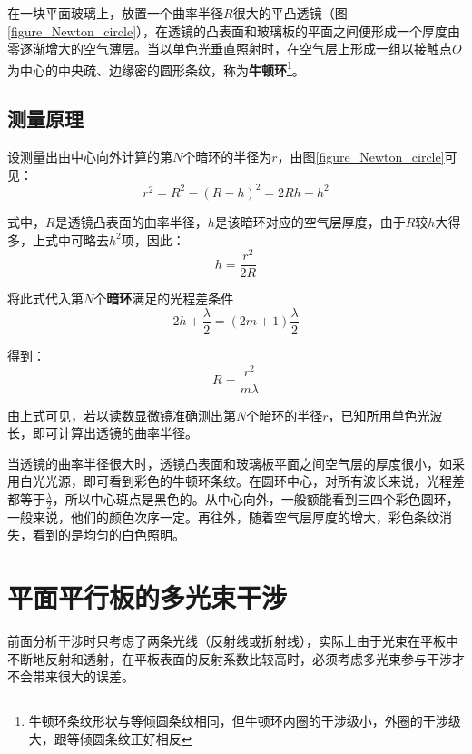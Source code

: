 \documentclass[UTF8]{ctexart}
\begin{document}
	在一块平面玻璃上，放置一个曲率半径$ R $很大的平凸透镜（图\ref{figure_Newton_circle}），在透镜的凸表面和玻璃板的平面之间便形成一个厚度由零逐渐增大的空气薄层。当以单色光垂直照射时，在空气层上形成一组以接触点$ O $为中心的中央疏、边缘密的圆形条纹，称为\textbf{牛顿环}\footnote{牛顿环条纹形状与等倾圆条纹相同，但牛顿环内圈的干涉级小，外圈的干涉级大，跟等倾圆条纹正好相反}。
	
	\subsection{测量原理}
	设测量出由中心向外计算的第$ N $个暗环的半径为$ r $，由图\ref{figure_Newton_circle}可见：
	\begin{equation}
		r^{2}=R^{2}-(R-h)^{2}=2 R h-h^{2}
	\end{equation}
	
\noindent 式中，$ R $是透镜凸表面的曲率半径，$ h $是该暗环对应的空气层厚度，由于$ R $较$ h $大得多，上式中可略去$ h^{2} $项，因此：
\begin{equation}
	h=\frac{r^{2}}{2 R}
\end{equation}

\noindent 将此式代入第$ N $个\textbf{暗环}满足的光程差条件
\begin{equation}
	2 h+\frac{\lambda}{2}=(2 m+1) \frac{\lambda}{2}
\end{equation}

\noindent 得到：
\begin{equation}
R=\frac{r^{2}}{m \lambda}
\end{equation}

\noindent 由上式可见，若以读数显微镜准确测出第$ N $个暗环的半径$ r $，已知所用单色光波长，即可计算出透镜的曲率半径。

	当透镜的曲率半径很大时，透镜凸表面和玻璃板平面之间空气层的厚度很小，如采用白光光源，即可看到彩色的牛顿环条纹。在圆环中心，对所有波长来说，光程差都等于$\frac{\lambda}{2}$，所以中心斑点是黑色的。从中心向外，一般额能看到三四个彩色圆环，一般来说，他们的颜色次序一定。再往外，随着空气层厚度的增大，彩色条纹消失，看到的是均匀的白色照明。
	
	\section{平面平行板的多光束干涉}
	前面分析干涉时只考虑了两条光线（反射线或折射线），实际上由于光束在平板中不断地反射和透射，在平板表面的反射系数比较高时，必须考虑多光束参与干涉才不会带来很大的误差。
	
\end{document}
